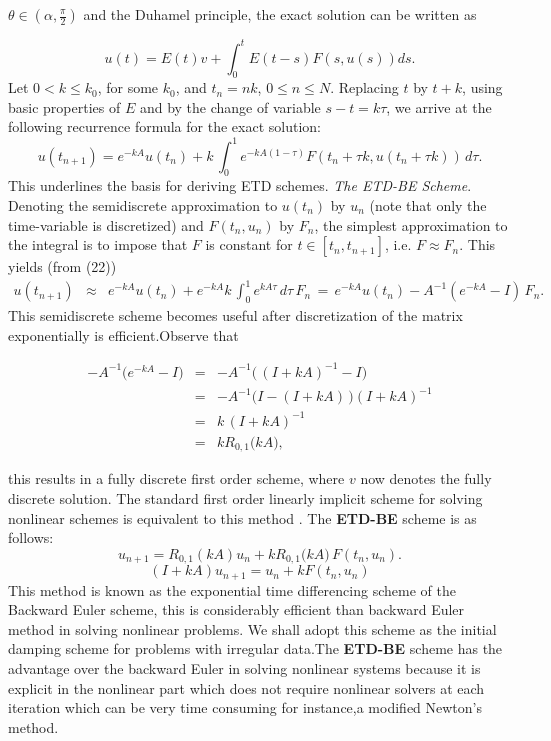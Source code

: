 \documentclass[12pt]{article}
\numberwithin{equation}{section} %
\begin{document}
$\theta \in (\alpha, \frac{\pi}{2})$ and the Duhamel principle, the
exact solution  can be written as

\begin{equation}
u(t)=E(t)v+\int_{0}^t E(t-s) F(s,u(s)) ds. \label{NL-DP}
\end{equation}
Let $0 < k \le k_0$, for some $k_0$, and $t_n = nk$, $0\leq n \leq N
$. Replacing $t$ by $t+k$, using basic properties of $E$ and by the
change of variable $s-t=k\tau$,  we arrive at the following
recurrence formula for the exact solution:
\begin{equation}
u(t_{n+1})= e^{-kA}u(t_n) + k\,\int_{0}^1 e^{-kA(1-\tau)} F(t_n+\tau
k, u(t_n+\tau k))\,d\tau.\label{Ch7-Eq2}
\end{equation}
This underlines the  basis for deriving ETD schemes.
 {\em The ETD-BE Scheme}.
Denoting the semidiscrete  approximation to $u(t_n)$ by $u_n$ (note
that only the time-variable is discretized) and $F(t_n, u_n)$ by
$F_n$, the simplest approximation to the integral is to impose that
$F$ is constant for $t \in [t_n, t_{n+1}]$, i.e. $F \approx F_n$.
This yields (from (22))
\begin{eqnarray}
u(t_{n+1}) &\approx & e^{-kA}u(t_n) + e^{-kA} k  \,\int_{0}^1
e^{kA\tau} \,d\tau \,F_n \, = \, e^{-kA}u(t_n) - A^{-1}
\left(e^{-kA} - I\right) \,F_n.  \label{ETD1_sd}
\end{eqnarray}
This semidiscrete scheme becomes useful after discretization of the
matrix exponentially is efficient.Observe that


\begin{eqnarray}
 -A^{-1} \big( e^{-kA} -I \big) &=& -A^{-1}  \big(  \, (I+kA)^{-1} -I \big)\nonumber\\
             &=& -A^{-1}  \big( I-(I+kA) \,\big)(I+kA)^{-1}\nonumber\\
             &=& k \, (I+kA)^{-1}\nonumber\\
             &=& kR_{0,1}\big(kA\big),\label{derivation_ETD1}
\end{eqnarray}

this results in  a fully discrete first order scheme, where $v$ now
denotes the fully discrete solution. The standard first order
linearly implicit  scheme for solving nonlinear schemes is
equivalent to  this method . The \textbf{ETD-BE} scheme is as
follows:
\begin{equation}
u_{n+1} = R_{0,1}(kA)u_n + kR_{0,1}\big(kA\big) \,F(t_n, u_n).
\label{ETD1}
\end{equation}
\begin{equation}\label{fdd}
(I+kA)u_{n+1}=u_n +kF(t_n,u_n)
\end{equation}
This method is known as the exponential time differencing scheme of
the Backward Euler scheme, this is considerably  efficient than
backward Euler method in solving nonlinear problems. We shall adopt
this scheme as the  initial damping scheme for problems with
irregular data.The \textbf{ETD-BE}  scheme has the advantage over
the backward Euler in solving nonlinear systems because it is
explicit in the nonlinear part which does not require nonlinear
solvers at each iteration which can be very time consuming for
instance,a modified Newton's method.
\end{document}
